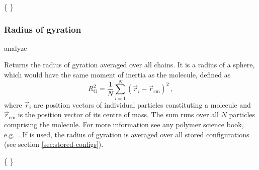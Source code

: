 \begin{code}
\{     \}
\end{code}

\subsubsection{Radius of gyration}
\begin{pysyntax}
\end{pysyntax}
\begin{essyntax}
  analyze  
\end{essyntax}

Returns the radius of gyration averaged over all chains. It is a radius
of a sphere, which would have the same moment of inertia as the molecule, 
defined as
\begin{equation}
\label{eq:Rg}
R_{\mathrm G}^2 = \frac{1}{N} \sum\limits_{i=1}^{N} \left(\vec r_i - \vec r_{\mathrm{cm}}\right)^2\,,
\end{equation}
where $\vec r_i$ are position vectors of individual particles constituting a molecule
and $\vec r_{\mathrm{cm}}$ is the position vector of its centre of mass. The sum runs
over all $N$ particles comprising the molecule. For more information see
any polymer science book, e.g.~\cite{rubinstein03a}.
If  is used, the radius of gyration is averaged over all stored
configurations (see section \vref{sec:stored-configs}).

\begin{code}
\{     \}
\end{code}


